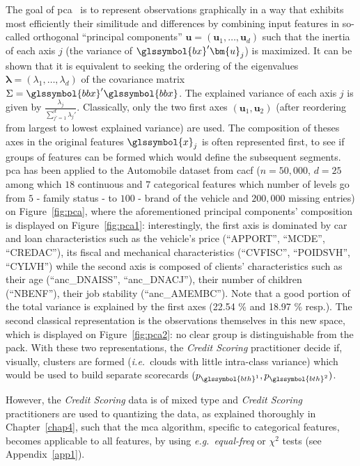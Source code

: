 The goal of \gls{pca}~\cite{pages2014multiple} is to represent observations graphically in a way that exhibits most efficiently their similitude and differences by combining input features in so-called orthogonal ``principal components'' $\bm{u} = (\bm{u}_1,\dots,\bm{u}_d)$ such that the inertia of each axis $j$ (the variance of $\glssymbol{bx}' \bm{u}_j$) is maximized. It can be shown that it is equivalent to seeking the ordering of the eigenvalues $\bm{\lambda} = (\lambda_1,\dots,\lambda_d)$ of the covariance matrix $\Sigma = \glssymbol{bbx}'\glssymbol{bbx}$. The explained variance of each axis $j$ is given by $\frac{\lambda_j}{\sum_{j'=1}^d \lambda_j'}$. Classically, only the two first axes $(\bm{u}_1,\bm{u}_2)$ (after reordering from largest to lowest explained variance) are used. The composition of theses axes in the original features $\glssymbol{x}_j$ is often represented first, to see if groups of features can be formed which would define the subsequent segments. \gls{pca} has been applied to the Automobile dataset from \gls{cacf} ($n = 50{,}000$, $d = 25$ among which $18$ continuous and $7$ categorical features which number of levels go from $5$ - family status - to $100$ - brand of the vehicle and $200{,}000$ missing entries) on Figure~\ref{fig:pca}, where the aforementioned principal components' composition is displayed on Figure~\ref{fig:pca1}: interestingly, the first axis is dominated by car and loan characteristics such as the vehicle's price (``APPORT'', ``MCDE'', ``CREDAC''), its fiscal and mechanical characteristics (``CVFISC'', ``POIDSVH'', ``CYLVH'') while the second axis is composed of clients' characteristics such as their age (``anc\_DNAISS'', ``anc\_DNACJ''), their number of children (``NBENF''), their job stability (``anc\_AMEMBC''). Note that a good portion of the total variance is explained by the first axes (22.54 \% and 18.97 \% resp.). The second classical representation is the observations themselves in this new space, which is displayed on Figure~\ref{fig:pca2}: no clear group is distinguishable from the pack. With these two representations, the \textit{Credit Scoring} practitioner decide if, visually, clusters are formed (\textit{i.e.}\ clouds with little intra-class variance) which would be used to build separate scorecards $(p_{\glssymbol{bth}^{1}},p_{\glssymbol{bth}^{2}})$.

However, the \textit{Credit Scoring} data is of mixed type and \textit{Credit Scoring} practitioners are used to quantizing the data, as explained thoroughly in Chapter~\ref{chap4}, such that the \gls{mca} algorithm, specific to categorical features, becomes applicable to all features, by using \textit{e.g.\ equal-freq} or $\chi^2$ tests (see Appendix~\ref{app1}).

